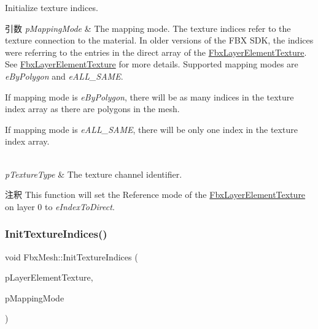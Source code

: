 Initialize texture indices. 
\begin{DoxyParams}{引数}
{\em p\+Mapping\+Mode} & The mapping mode. The texture indices refer to the texture connection to the material. In older versions of the F\+BX S\+DK, the indices were referring to the entries in the direct array of the \hyperlink{class_fbx_layer_element_texture}{Fbx\+Layer\+Element\+Texture}. See \hyperlink{class_fbx_layer_element_texture}{Fbx\+Layer\+Element\+Texture} for more details. Supported mapping modes are {\itshape e\+By\+Polygon} and {\itshape e\+A\+L\+L\+\_\+\+S\+A\+ME}.
\begin{DoxyItemize}
\item If mapping mode is {\itshape e\+By\+Polygon}, there will be as many indices in the texture index array as there are polygons in the mesh.
\item If mapping mode is {\itshape e\+A\+L\+L\+\_\+\+S\+A\+ME}, there will be only one index in the texture index array. 
\end{DoxyItemize}\\
\hline
{\em p\+Texture\+Type} & The texture channel identifier. \\
\hline
\end{DoxyParams}
\begin{DoxyRemark}{注釈}
This function will set the Reference mode of the \hyperlink{class_fbx_layer_element_texture}{Fbx\+Layer\+Element\+Texture} on layer 0 to {\itshape e\+Index\+To\+Direct}. 
\end{DoxyRemark}
\mbox{\label{class_fbx_mesh_a79732f5b5d10581887b78877cd67b003}} 
\subsubsection{\texorpdfstring{Init\+Texture\+Indices()}{InitTextureIndices()}\hspace{0.1cm}{\footnotesize\ttfamily [2/2]}}
{\footnotesize\ttfamily void Fbx\+Mesh\+::\+Init\+Texture\+Indices (\begin{DoxyParamCaption}\item[{\hyperlink{class_fbx_layer_element_texture}{Fbx\+Layer\+Element\+Texture} $\ast$}]{p\+Layer\+Element\+Texture,  }\item[{\hyperlink{class_fbx_layer_element_a5a40e95db30ae9f94611dc3f1568af26}{Fbx\+Layer\+Element\+::\+E\+Mapping\+Mode}}]{p\+Mapping\+Mode }\end{DoxyParamCaption})\hspace{0.3cm}{\ttfamily [protected]}}

